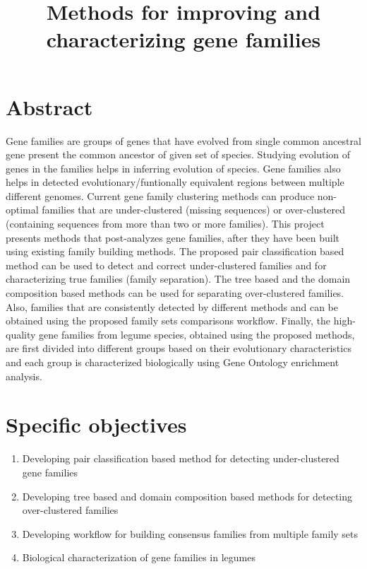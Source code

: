 \documentclass{article}
\date{}
\begin{document}
	\title{Methods for improving and characterizing gene families}
	\maketitle
	\section{Abstract}
	Gene families are groups of genes that have evolved from single common ancestral gene present the common ancestor of given set of species. Studying evolution of genes in the families helps in inferring evolution of species. Gene families also helps in detected evolutionary/funtionally equivalent regions between multiple different genomes. Current gene family clustering methods can produce non-optimal families that are under-clustered (missing sequences) or over-clustered (containing sequences from more than two or more families). This project presents methods that post-analyzes gene families, after they have been built using existing family building methods. The proposed pair classification based method can be used to detect and correct under-clustered families and for characterizing true families (family separation). The tree based and the domain composition based methods can be used for separating over-clustered families. Also, families that are consistently detected by different methods and can be obtained using the proposed family sets comparisons workflow. Finally, the high-quality gene families from legume species, obtained using the proposed methods, are first divided into different groups based on their evolutionary characteristics and each group is characterized biologically using Gene Ontology enrichment analysis.  
	
	\section{Specific objectives}
		\begin{enumerate}
			\item Developing pair classification based method for detecting under-clustered gene families
			
			\item Developing tree based and domain composition based methods for detecting over-clustered families
			
			\item Developing workflow for building consensus families from multiple family sets
			
			\item Biological characterization of gene families in legumes
		\end{enumerate}
	
\end{document}
